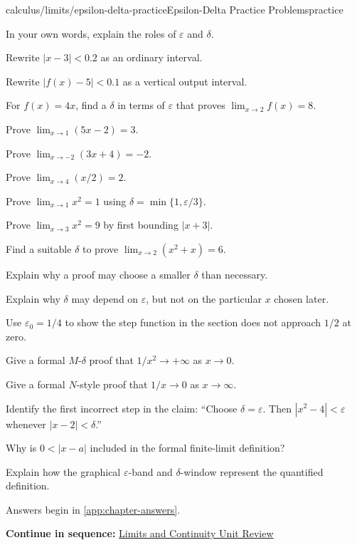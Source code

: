 \documentclass[11pt,openany]{book}
\theoremstyle{bgplain}
\newcommand{\webnext}[2]{%
  \par\addvspace{1.2em}\noindent{\color{BGLine}\rule{\textwidth}{0.35pt}}\par\smallskip
  {\small\color{BGGray}\textbf{Continue in sequence:} \hyperlink{web:#1}{#2}}\par
}
\newcommand{\eps}{\varepsilon}
\begin{document}
\begin{webpage}{calculus/limits/epsilon-delta-practice}{Epsilon-Delta Practice Problems}{practice}
\begin{bgexercises}[label=\textbf{6.\arabic*}]
  \item In your own words, explain the roles of \(\eps\) and \(\delta\).
  \item Rewrite \(|x-3|<0.2\) as an ordinary interval.
  \item Rewrite \(|f(x)-5|<0.1\) as a vertical output interval.
  \item For \(f(x)=4x\), find a \(\delta\) in terms of \(\eps\) that proves \(\lim_{x\to2}f(x)=8\).
  \item Prove \(\lim_{x\to1}(5x-2)=3\).
  \item Prove \(\lim_{x\to-2}(3x+4)=-2\).
  \item Prove \(\lim_{x\to4}(x/2)=2\).
  \item Prove \(\lim_{x\to1}x^2=1\) using \(\delta=\min\{1,\eps/3\}\).
  \item Prove \(\lim_{x\to3}x^2=9\) by first bounding \(|x+3|\).
  \item Find a suitable \(\delta\) to prove \(\lim_{x\to2}(x^2+x)=6\).
  \item Explain why a proof may choose a smaller \(\delta\) than necessary.
  \item Explain why \(\delta\) may depend on \(\eps\), but not on the particular \(x\) chosen later.
  \item Use \(\eps_0=1/4\) to show the step function in the section does not approach \(1/2\) at zero.
  \item Give a formal \(M\)-\(\delta\) proof that \(1/x^2\to+\infty\) as \(x\to0\).
  \item Give a formal \(N\)-style proof that \(1/x\to0\) as \(x\to\infty\).
  \item Identify the first incorrect step in the claim: ``Choose \(\delta=\eps\). Then \(|x^2-4|<\eps\) whenever \(|x-2|<\delta\).''
  \item Why is \(0<|x-a|\) included in the formal finite-limit definition?
  \item Explain how the graphical \(\eps\)-band and \(\delta\)-window represent the quantified definition.
\end{bgexercises}

Answers begin in \cref{app:chapter-answers}.
\webnext{calculus/limits/unit-review}{Limits and Continuity Unit Review}
\end{webpage}


\end{document}
